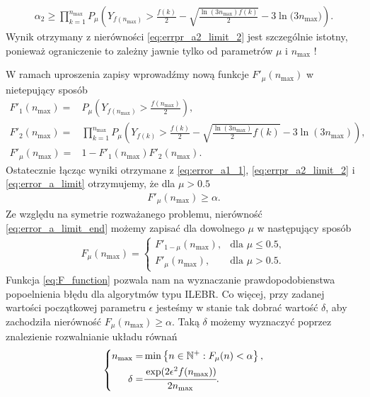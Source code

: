 \documentclass[inzynierska]{pwr_wmat_praca_dyplomowa}
\theoremstyle{plain}
\numberwithin{theorem}{chapter}
\theoremstyle{definition}
\numberwithin{theorem}{chapter}
\newcommand{\nmax}{n_{\text{max}}}
\begin{document}
	\begin{align}
		\label{eq:errpr_a2_limit_2}
		\alpha_2 \ge \prod_{k=1}^{\nmax} P_{\mu}\left( Y_{f(\nmax)}  > \frac{f(k)}{2} -  \sqrt{\frac{\ln(3\nmax)f(k)}{2}} - 3  \ln{(3\nmax})  \right).
	\end{align}
	Wynik otrzymany z nierówności \eqref{eq:errpr_a2_limit_2} jest szczególnie istotny, ponieważ ograniczenie to zależny jawnie tylko od parametrów $\mu$ i $\nmax$ !
	
	W ramach uproszenia zapisy wprowadźmy nową funkcje  $F'_{\mu}(\nmax)$ w nietepujący sposób
	\begin{align}
		F'_{1}(\nmax) =& P_{\mu}\left( Y_{f(\nmax)}  > \frac{f(\nmax)}{2} \right), \\
		F'_{2}(\nmax) =& \prod_{k=1}^{\nmax} P_{\mu}\left( Y_{f(k)}  > \frac{f(k)}{2} - \sqrt{\frac{\ln(3\nmax)}{2}f(k)} - 3  \ln{(3 \nmax)}\right), \\
		\label{eq:error_a_limit}
		F'_{\mu}(\nmax) =& 1 -F'_{1}(\nmax)F'_{2}(\nmax).
	\end{align}
		Ostatecznie łącząc wyniki otrzymane z \eqref{eq:error_a1_1}, \eqref{eq:errpr_a2_limit_2} i \eqref{eq:error_a_limit} otrzymujemy, że dla $\mu > 0.5$
	\begin{gather}
		\label{eq:error_a_limit_end}
		F'_{\mu}(\nmax) \ge \alpha .
	\end{gather}
		Ze względu na symetrie rozważanego problemu, nierówność \eqref{eq:error_a_limit_end} możemy zapisać dla dowolnego $\mu$ w następujący sposób
	\begin{align}
		\label{eq:F_function}
		F_{\mu}(\nmax) = 
		\begin{cases}
			F'_{1-\mu}(\nmax), &\text{dla }  \mu\le0.5,\\
			F'_{\mu}(\nmax), &\text{dla } \mu>0.5.
		\end{cases}
	\end{align}
	Funkcja \eqref{eq:F_function} pozwala nam na wyznaczanie prawdopodobienstwa popoelnienia błędu dla algorytmów typu ILEBR. Co więcej, przy zadanej wartości początkowej parametru $\epsilon$ jesteśmy w stanie tak dobrać wartość $\delta$, aby zachodziła nierówność $	F_{\mu}(\nmax) \ge \alpha$. Taką $\delta$ możemy wyznaczyć poprzez znalezienie rozwalnianie układu równań 
	\begin{gather}
		\label{eq:alpfa_determinant}
		\left\{
		\begin{split}
			\nmax =& \min \left\{n\in \mathbb{N}^+: F_{\mu}(n) < \alpha \right\}, \\
			\delta =&   \cfrac{\exp(2\epsilon^2f(\nmax))}{2\nmax}.
		\end{split}
		\right. 
	\end{gather}
\end{document}

